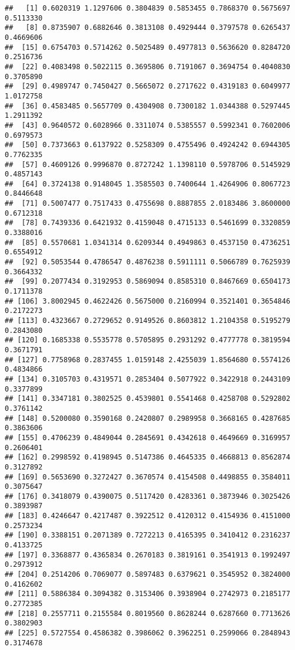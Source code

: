 \documentclass[
]{article}
\begin{document}
\begin{verbatim}
##   [1] 0.6020319 1.1297606 0.3804839 0.5853455 0.7868370 0.5675697 0.5113330
##   [8] 0.8735907 0.6882646 0.3813108 0.4929444 0.3797578 0.6265437 0.4669606
##  [15] 0.6754703 0.5714262 0.5025489 0.4977813 0.5636620 0.8284720 0.2516736
##  [22] 0.4083498 0.5022115 0.3695806 0.7191067 0.3694754 0.4040830 0.3705890
##  [29] 0.4989747 0.7450427 0.5665072 0.2717622 0.4319183 0.6049977 1.0172758
##  [36] 0.4583485 0.5657709 0.4304908 0.7300182 1.0344388 0.5297445 1.2911392
##  [43] 0.9640572 0.6028966 0.3311074 0.5385557 0.5992341 0.7602006 0.6979573
##  [50] 0.7373663 0.6137922 0.5258309 0.4755496 0.4924242 0.6944305 0.7762335
##  [57] 0.4609126 0.9996870 0.8727242 1.1398110 0.5978706 0.5145929 0.4857143
##  [64] 0.3724138 0.9148045 1.3585503 0.7400644 1.4264906 0.8067723 0.8446648
##  [71] 0.5007477 0.7517433 0.4755698 0.8887855 2.0183486 3.8600000 0.6712318
##  [78] 0.7439336 0.6421932 0.4159048 0.4715133 0.5461699 0.3320859 0.3388016
##  [85] 0.5570681 1.0341314 0.6209344 0.4949863 0.4537150 0.4736251 0.6554912
##  [92] 0.5053544 0.4786547 0.4876238 0.5911111 0.5066789 0.7625939 0.3664332
##  [99] 0.2077434 0.3192953 0.5869094 0.8585310 0.8467669 0.6504173 0.1711378
## [106] 3.8002945 0.4622426 0.5675000 0.2160994 0.3521401 0.3654846 0.2172273
## [113] 0.4323667 0.2729652 0.9149526 0.8603812 1.2104358 0.5195279 0.2843080
## [120] 0.1685338 0.5535778 0.5705895 0.2931292 0.4777778 0.3819594 0.3671791
## [127] 0.7758968 0.2837455 1.0159148 2.4255039 1.8564680 0.5574126 0.4834866
## [134] 0.3105703 0.4319571 0.2853404 0.5077922 0.3422918 0.2443109 0.3377899
## [141] 0.3347181 0.3802525 0.4539801 0.5541468 0.4258708 0.5292802 0.3761142
## [148] 0.5200080 0.3590168 0.2420807 0.2989958 0.3668165 0.4287685 0.3863606
## [155] 0.4706239 0.4849044 0.2845691 0.4342618 0.4649669 0.3169957 0.2606401
## [162] 0.2998592 0.4198945 0.5147386 0.4645335 0.4668813 0.8562874 0.3127892
## [169] 0.5653690 0.3272427 0.3670574 0.4154508 0.4498855 0.3584011 0.3075647
## [176] 0.3418079 0.4390075 0.5117420 0.4283361 0.3873946 0.3025426 0.3893987
## [183] 0.4246647 0.4217487 0.3922512 0.4120312 0.4154936 0.4151000 0.2573234
## [190] 0.3388151 0.2071389 0.7272213 0.4165395 0.3410412 0.2316237 0.4133725
## [197] 0.3368877 0.4365834 0.2670183 0.3819161 0.3541913 0.1992497 0.2973912
## [204] 0.2514206 0.7069077 0.5897483 0.6379621 0.3545952 0.3824000 0.4162602
## [211] 0.5886384 0.3094382 0.3153406 0.3938904 0.2742973 0.2185177 0.2772385
## [218] 0.2557711 0.2155584 0.8019560 0.8628244 0.6287660 0.7713626 0.3802903
## [225] 0.5727554 0.4586382 0.3986062 0.3962251 0.2599066 0.2848943 0.3174678

\end{verbatim}
\end{document}
